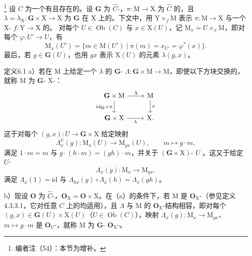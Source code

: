 \footnote{编者注（54）：本节为增补。} 设 $C$ 为一个有且存在的。设 $\mathbf G$ 为 $\widehat C$-，$\pi:\mathrm M\to\mathrm X$ 为 $\widehat C$ 的，且 $\lambda=\lambda_{\mathrm X}:\mathbf G\times\mathrm X\to\mathrm X$ 为 $\mathbf G$ 在 $\mathrm X$ 上的。下文中，用 $\mathrm Y\times_f\mathrm M$ 表示 $\pi:\mathrm M\to\mathrm X$ 与一个 $\mathrm X$- $f:\mathrm Y\to\mathrm X$ 的。
对每个 $U\in\operatorname{Ob}(C)$ 与 $x\in\mathrm X(U)$，记 $\mathrm M_x=U\times_x\mathrm M$，即对每个 $\varphi:U'\to U$，有
\[
\mathrm M_x(U')=\{m\in\mathrm M(U')\mid\pi(m)=x_{U'}=\varphi^*(x)\}.
\]
最后，若 $g\in\mathbf G(U)$，也用 $gx$ 表示 $\mathrm X(U)$ 的元素 $\lambda(g,x)$。
\begin{SGAresult}{定义}{6.1}
a）若在 $\mathrm M$ 上给定一个 $\lambda$ 的 $\mathbf G$- $\Lambda:\mathbf G\times\mathrm M\to\mathrm M$，即使以下方块交换的，就称 $\mathrm M$ 为 $\mathbf G$- $\mathrm X$-：
\[
\begin{tikzcd}
\mathbf G\times\mathrm M\arrow[r,"{\Lambda}"]\arrow[d,"{\mathrm{id}_{\mathbf G}\times\pi}"']&\mathrm M\arrow[d,"{\pi}"]\\
\mathbf G\times\mathrm X\arrow[r,"{\lambda}"']&\mathrm X.
\end{tikzcd}
\]
这于对每个 $(g,x):U\to\mathbf G\times\mathrm X$ 给定映射
\[
\Lambda_x^U(g):\mathrm M_x(U)\longrightarrow\mathrm M_{gx}(U),\qquad m\longmapsto g\cdot m,
\]
满足 $1\cdot m=m$ 与 $g\cdot(h\cdot m)=(gh)\cdot m$，并关于 $(\mathbf G\times\mathrm X)$- $U$ 。这又于给定 $U$-
\[
\Lambda_x(g):\mathrm M_x\longrightarrow\mathrm M_{gx},
\]
满足 $\Lambda_x(1)=\mathrm{id}$ 与 $\Lambda_{hx}(g)\circ\Lambda_x(h)=\Lambda_x(gh)$。

b）现设 $\mathbf O$ 为 $\widehat C$-，$\mathbf O_{\mathrm X}=\mathbf O\times\mathrm X$。在（a）的条件下，若 $\mathrm M$ 是 $\mathbf O_{\mathrm X}$-（参见定义 4.3.3.1，它对任意 $C$ 上的均适用），且 $\Lambda$ 与 $\mathrm M$ 的 $\mathbf O_{\mathrm X}$-结构相容，即对每个 $(g,x)\in\mathbf G(U)\times\mathrm X(U)$（$U\in\operatorname{Ob}(C)$），映射 $\Lambda_x(g):\mathrm M_x\to\mathrm M_{gx}$、$m\mapsto g\cdot m$ 是 $\mathbf O_U$-，就称 $\mathrm M$ 为 $\mathbf G$- $\mathbf O_{\mathrm X}$-。
\end{SGAresult}
